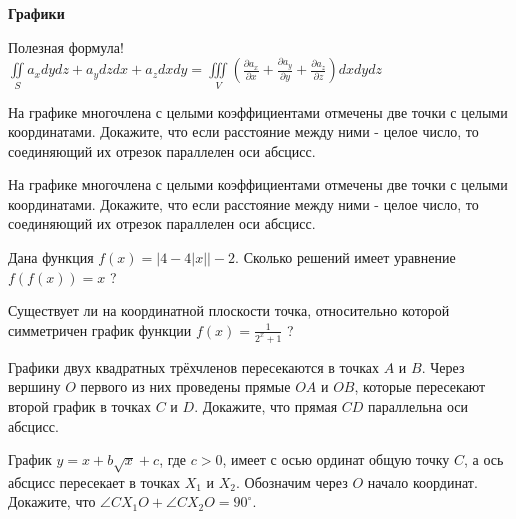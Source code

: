 \centerline{\bf \Huge Графики}
\centerline{\bf \Huge }

\begin{flushright}
        \scriptsize{Полезная формула!
        \\$\iint\limits_S a_x d y d z+a_y d z d x+a_z d x d y=\iiint\limits_V\left(\frac{\partial a_x}{\partial x}+\frac{\partial a_y}{\partial y}+\frac{\partial a_z}{\partial z}\right) d x d y d z$}
\end{flushright}

На графике многочлена с целыми коэффициентами отмечены две точки с целыми координатами. Докажите, что если расстояние между ними - целое число, то соединяющий их отрезок параллелен оси абсцисс.

На графике многочлена с целыми коэффициентами отмечены две точки с целыми координатами. Докажите, что если расстояние между ними - целое число, то соединяющий их отрезок параллелен оси абсцисс.

Дана функция $f(x)=|4-4| x| |-2$. Сколько решений имеет уравнение $f(f(x))=x$ ?

Существует ли на координатной плоскости точка, относительно которой симметричен график функции $f(x)=\frac{1}{2^x+1}$ ?

Графики двух квадратных трёхчленов пересекаются в точках $A$ и $B$. Через вершину $O$ первого из них проведены прямые $O A$ и $O B$, которые пересекают второй график в точках $C$ и $D$. Докажите, что прямая $C D$ параллельна оси абсцисс.

График $y=x+b \sqrt{x}+c$, где $c>0$, имеет с осью ординат общую точку $C$, а ось абсцисс пересекает в точках $X_1$ и $X_2$. Обозначим через $O$ начало координат. Докажите, что $\angle C X_1 O+\angle C X_2 O=90^{\circ}$.